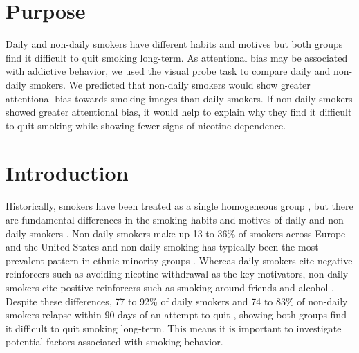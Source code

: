 \documentclass[empirical, authordate]{jote-new-article}
\begin{document}
\section{Purpose}

Daily and non-daily smokers have different habits and motives but both groups find it difficult to quit smoking long-term. As attentional bias may be associated with addictive behavior, we used the visual probe task to compare daily and non-daily smokers. We predicted that non-daily smokers would show greater attentional bias towards smoking images than daily smokers. If non-daily smokers showed greater attentional bias, it would help to explain why they find it difficult to quit smoking while showing fewer signs of nicotine dependence.



\section{Introduction}

Historically, smokers have been treated as a single homogeneous group \parencite{Shiffman2009}, but there are fundamental differences in the smoking habits and motives of daily and non-daily smokers \parencite{Shiffman2012, Shiffman2012a}. Non-daily smokers make up 13 to 36\% of smokers across Europe and the United States \parencite{Bogdanovica2011, Kotz2012, Tindle2011} and non-daily smoking has typically been the most prevalent pattern in ethnic minority groups \parencite{Fagan2009, Tong2006}. Whereas daily smokers cite negative reinforcers such as avoiding nicotine withdrawal as the key motivators, non-daily smokers cite positive reinforcers such as smoking around friends and alcohol \parencite{Shiffman2014, Shiffman2012}. Despite these differences, 77 to 92\% of daily smokers and 74 to 83\% of non-daily smokers relapse within 90 days of an attempt to quit \parencite{Bogdanovica2011, Kotz2012, Tindle2011}, showing both groups find it difficult to quit smoking long-term. This means it is important to investigate potential factors associated with smoking behavior.
\end{document}

